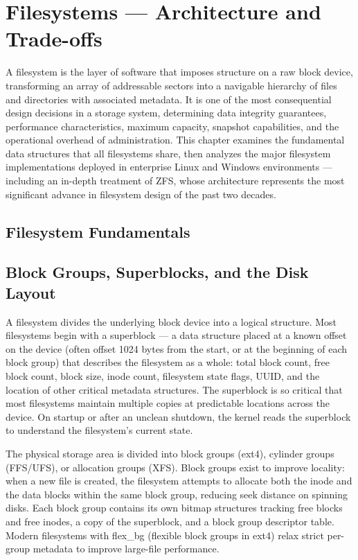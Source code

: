 \chapter{Filesystems --- Architecture and Trade-offs}
\label{ch:3}

A filesystem is the layer of software that imposes structure on a raw block device, transforming an array of addressable sectors into a navigable hierarchy of files and directories with associated metadata. It is one of the most consequential design decisions in a storage system, determining data integrity guarantees, performance characteristics, maximum capacity, snapshot capabilities, and the operational overhead of administration. This chapter examines the fundamental data structures that all filesystems share, then analyzes the major filesystem implementations deployed in enterprise Linux and Windows environments --- including an in-depth treatment of ZFS, whose architecture represents the most significant advance in filesystem design of the past two decades.

\section{Filesystem Fundamentals}
\section{Block Groups, Superblocks, and the Disk Layout}
A filesystem divides the underlying block device into a logical structure. Most filesystems begin with a superblock --- a data structure placed at a known offset on the device (often offset 1024 bytes from the start, or at the beginning of each block group) that describes the filesystem as a whole: total block count, free block count, block size, inode count, filesystem state flags, UUID, and the location of other critical metadata structures. The superblock is so critical that most filesystems maintain multiple copies at predictable locations across the device. On startup or after an unclean shutdown, the kernel reads the superblock to understand the filesystem's current state.

The physical storage area is divided into block groups (ext4), cylinder groups (FFS/UFS), or allocation groups (XFS). Block groups exist to improve locality: when a new file is created, the filesystem attempts to allocate both the inode and the data blocks within the same block group, reducing seek distance on spinning disks. Each block group contains its own bitmap structures tracking free blocks and free inodes, a copy of the superblock, and a block group descriptor table. Modern filesystems with flex\_bg (flexible block groups in ext4) relax strict per-group metadata to improve large-file performance.


